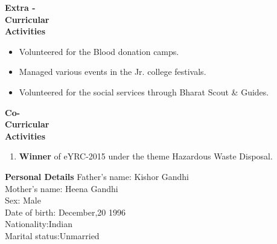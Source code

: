 \documentclass{article}
\begin{document}
	     	 	
	     \begin{flushleft} 
	     	\vspace{0.4in}
	     	\textbf{Extra - \\Curricular \\Activities }
	     	\begin{itemize}
	     		\vspace{-0.65in}
	     		\addtolength{\itemindent}{1.359in}
	     		\item  Volunteered for the Blood donation camps.
	     		\item  Managed various events in the Jr. college festivals.
	     		\item  Volunteered for the social services through Bharat Scout \& Guides.  
	     		
	     	\end{itemize}
	     \end{flushleft}
	     
	   \begin{flushleft} 
	      	\vspace{0.4in}
	      	\textbf{Co- \\Curricular \\Activities }
	      	\begin{enumerate}
	      		\vspace{-0.65in}
	      		\addtolength{\itemindent}{1.359in}
	      		\item  \textbf{Winner} of eYRC-2015 under the theme Hazardous Waste Disposal. 
	      	\end{enumerate}
	      \end{flushleft}
	      
	    \begin{flushleft}
	      	\vspace{0.4in}
	      	\textbf{Personal Details} \hspace{0.36in}Father's name: \hspace{0.13in} Kishor Gandhi \\
	      	\hspace{1.55in}Mother's name: \hspace{0.08in} Heena Gandhi\\
	      	\hspace{1.55in}Sex:\hspace{0.85in} Male\\
	      	\hspace{1.55in}Date of birth:\hspace{0.255in} December,20 1996	\\
	      	\hspace{1.55in}Nationality:\hspace{0.45in}Indian\\
	      	\hspace{1.55in}Marital status:\hspace{0.28in}Unmarried
	      	
	      \end{flushleft}
	      
\end{document}
